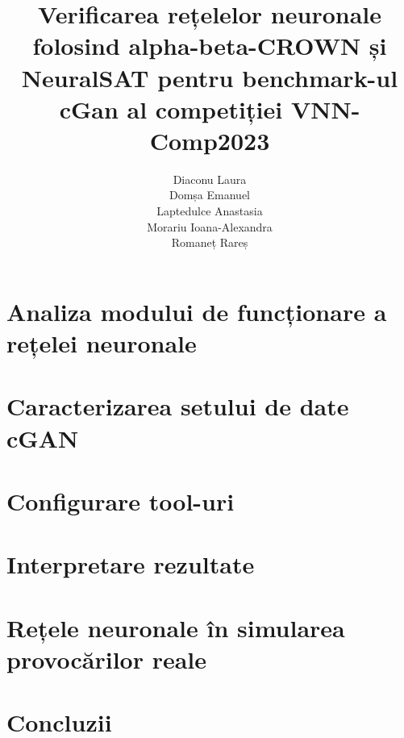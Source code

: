 \documentclass{beamer}
\title{Verificarea rețelelor neuronale folosind alpha-beta-CROWN și NeuralSAT pentru benchmark-ul cGan al competiției VNN-Comp2023}
\author{Diaconu Laura \\ Domșa Emanuel \\
Laptedulce Anastasia \\ Morariu Ioana-Alexandra \\
Romaneț Rareș}
\date{}
\begin{document}
\begin{frame}
\titlepage
\end{frame}


\section{Analiza modului de funcționare a rețelei neuronale}


\section{Caracterizarea setului de date cGAN}


\section{Configurare tool-uri}


\section{Interpretare rezultate}


\section{Rețele neuronale în simularea provocărilor reale}


\section{Concluzii}

\end{document}
